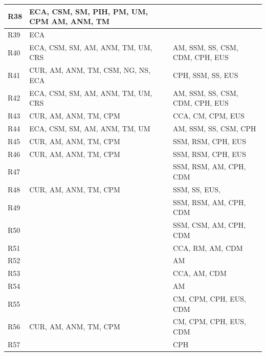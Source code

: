 \documentclass{Configuration_Files/PoliMi3i_thesis}
\begin{document}
\begin{xltabular}{\textwidth}{| >{}l | X | X |}
R38 & ECA, CSM, SM, PIH, PM, UM, CPM AM, ANM, TM & \B\\
\hline
    
R39 & ECA & \B\\
\hline

R40 & ECA, CSM, SM, AM, ANM, TM, UM, CRS & AM, SSM, SS, CSM, CDM, CPH, EUS \B\\
\hline

R41 & CUR, AM, ANM, TM, CSM, NG, NS, ECA & CPH, SSM, SS, EUS \B\\
\hline

R42 & ECA, CSM, SM, AM, ANM, TM, UM, CRS & AM, SSM, SS, CSM, CDM, CPH, EUS \B\\
\hline

R43 & CUR, AM, ANM, TM, CPM & CCA, CM, CPM, EUS \B\\
\hline
    
R44 & ECA, CSM, SM, AM, ANM, TM, UM & AM, SSM, SS, CSM, CPH \B\\
\hline

R45 & CUR, AM, ANM, TM, CPM & SSM, RSM, CPH, EUS \B\\
\hline
 
R46 & CUR, AM, ANM, TM, CPM & SSM, RSM, CPH, EUS \B\\
\hline

R47 &  & SSM, RSM, AM, CPH, CDM \B\\
\hline

R48 & CUR, AM, ANM, TM, CPM & SSM, SS, EUS, \B\\
\hline

R49 &  & SSM, RSM, AM, CPH, CDM \B\\
\hline

R50 & & SSM, CSM, AM, CPH, CDM \B\\
\hline

R51 & & CCA, RM, AM, CDM \B\\
\hline

R52 & & AM \B\\
\hline

R53 & & CCA, AM, CDM \B\\
\hline

R54 & & AM \B\\
\hline

R55 & & CM, CPM, CPH, EUS, CDM \B\\
\hline

R56 & CUR, AM, ANM, TM, CPM & CM, CPM, CPH, EUS, CDM \B\\
\hline

R57 & & CPH \B\\
\hline


\end{xltabular}
\end{document}
